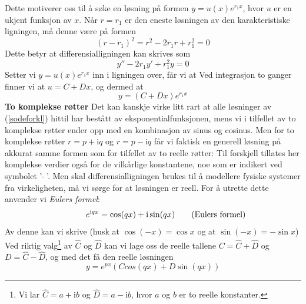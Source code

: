 Dette motiverer oss til å søke en løsning på formen $ {y=u(x)e^{r_1x} }$, hvor $ u $ er en ukjent funksjon av $ x $.
Når $ {r=r_1} $ er den eneste løsningen av den karakteristiske ligningen, må denne være på formen
\[ (r-r_1)^2=r^2-2r_1r+r_1^2=0  \]
Dette betyr at differensialligningen kan skrives som
\[ y''-2r_1 y'+r_1^2y=0 \]
Setter vi $ y=u(x)e^{r_1x} $ inn i ligningen over, får vi at
Ved integrasjon to ganger finner vi at $ u=C+Dx $, og dermed at 
\[ y = (C+Dx)e^{r_1x} \]
\textbf{To komplekse røtter}\bs
Det kan kanskje virke litt rart at alle løsninger av (\ref{sodeforkl}) hittil har bestått av eksponentialfunksjonen, mens vi i tilfellet av to komplekse røtter ender opp med en kombinasjon av sinus og cosinus. Men for to komplekse røtter $ {r= p+\mathrm{i}q}$ og $ {r= p-\mathrm{i}q}$ får vi faktisk en generell løsning på akkurat samme formen som for tilfellet av to reelle røtter:
Til forskjell tillates her komplekse verdier også for de vilkårlige konstantene, noe som er indikert ved symbolet '$ \;\hat{}\; $'. Men skal differensialligningen brukes til å modellere fysiske systemer fra virkeligheten, må vi sørge for at løsningen er reell. For å utrette dette anvender vi \textit{Eulers formel}:
\[ \phantom{aaaaaa}e^{\mathrm{i}qx}=\cos(qx)+\mathrm{i}\sin(qx) \tag{\text{Eulers formel}}\]
Av denne kan vi skrive (husk at $ {\cos(-x)=\cos x} $ og at $ {\sin(-x)=-\sin x} $)
\small {}
\normalsize
Ved riktig valg\footnote{Vi lar $ \hat{C}=a+\mathrm{i}b $ og $ \hat{D}=a-\mathrm{i}b $, hvor $ a $ og $ b $ er to reelle konstanter.} av $ \hat{C} $ og $ \hat{D} $ kan vi lage oss de reelle tallene $ {C=\hat{C}+\hat{D}}  $ og $ D=\hat{C}-\hat{D} $, og med det få den reelle løsningen
\[ y =  e^{px}(Ccos (qx) + D \sin (qx))  \]

